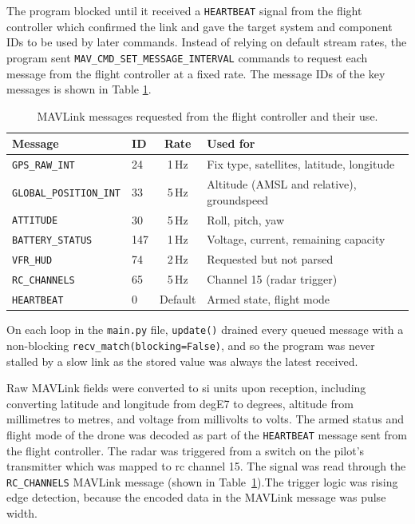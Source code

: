 The program blocked until it received a \texttt{HEARTBEAT} signal from the flight controller which confirmed the link and gave the target system and component IDs to be used by later commands. Instead of relying on default stream rates, the program sent \texttt{MAV\_CMD\_SET\_MESSAGE\_INTERVAL} commands to request each message from the flight controller at a fixed rate. The message IDs of the key messages is shown in Table \ref{tab:mavlink_messages}.


\begin{table}[htbp]
    \centering
    \caption{MAVLink messages requested from the flight controller and their use.}
    \label{tab:mavlink_messages}
    \begin{tabular}{llcl}
        \toprule
        \textbf{Message} & \textbf{ID} & \textbf{Rate} & \textbf{Used for} \\
        \midrule
        \texttt{GPS\_RAW\_INT}         & 24  & 1\,Hz   & Fix type, satellites, latitude, longitude \\
        \texttt{GLOBAL\_POSITION\_INT} & 33  & 5\,Hz   & Altitude (AMSL and relative), groundspeed \\
        \texttt{ATTITUDE}              & 30  & 5\,Hz   & Roll, pitch, yaw \\
        \texttt{BATTERY\_STATUS}       & 147 & 1\,Hz   & Voltage, current, remaining capacity \\
        \texttt{VFR\_HUD}              & 74  & 2\,Hz   & Requested but not parsed \\
        \texttt{RC\_CHANNELS}          & 65  & 5\,Hz   & Channel 15 (radar trigger) \\
        \texttt{HEARTBEAT}             & 0   & Default & Armed state, flight mode \\
        \bottomrule
    \end{tabular}
\end{table}


On each loop in the \texttt{main.py} file, \texttt{update()} drained every queued message with a non-blocking \texttt{recv\_match(blocking=False)}, and so the program was never stalled by a slow link as the stored value was always the latest received. 

Raw MAVLink fields were converted to \gls{si} units upon reception, including converting latitude and longitude from degE7 to degrees, altitude from millimetres to metres, and voltage from millivolts to volts. The armed status and flight mode of the drone was decoded as part of the \texttt{HEARTBEAT} message sent from the flight controller. The radar was triggered from a switch on the pilot's transmitter which was mapped to \gls{rc} channel 15. The signal was read through the \texttt{RC\_CHANNELS} MAVLink message (shown in Table~\ref{tab:mavlink_messages}).The trigger logic was rising edge detection, because the encoded data in the MAVLink message was pulse width. 

